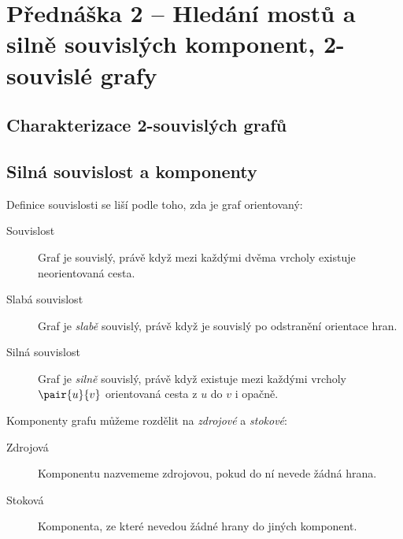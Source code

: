 \section{Přednáška 2 -- Hledání mostů a silně souvislých komponent, 2-souvislé grafy}

\subsection{Charakterizace 2-souvislých grafů}


\label{lemma:charakterizace-2-souvislosti}

\subsection{Silná souvislost a komponenty}

Definice souvislosti se liší podle toho, zda je graf orientovaný:

\begin{description}
    \item[Souvislost] Graf je souvislý, právě když mezi každými dvěma vrcholy existuje neorientovaná cesta.
    \item[Slabá souvislost] Graf je \textit{slabě} souvislý, právě když je souvislý po odstranění orientace hran.
    \item[Silná souvislost] Graf je \textit{silně} souvislý, právě když existuje mezi každými vrcholy $\pair{u}{v}$ orientovaná cesta z $u$ do $v$ i opačně.
\end{description}



Komponenty grafu můžeme rozdělit na \textit{zdrojové} a \textit{stokové}:

\begin{description}
    \item[Zdrojová] Komponentu nazvememe zdrojovou, pokud do ní nevede žádná hrana.
    \item[Stoková] Komponenta, ze které nevedou žádné hrany do jiných komponent.
\end{description}


